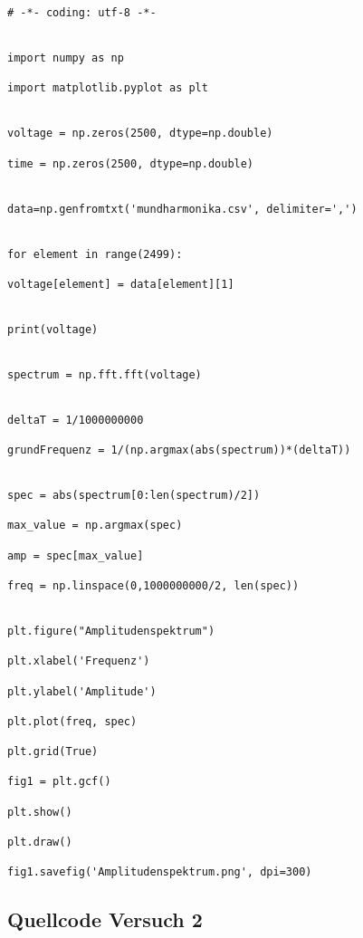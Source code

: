 \documentclass[12pt, oneside, a4paper, \docLanguage]{report}
\begin{document}
\begin{lstlisting}[style=PYTHON, frame=single, caption=Amplitudenspektrum plotten, captionpos=b, label=lst:Amplitudenspektrum_plotten]
# -*- coding: utf-8 -*-


import numpy as np

import matplotlib.pyplot as plt


voltage = np.zeros(2500, dtype=np.double)

time = np.zeros(2500, dtype=np.double)


data=np.genfromtxt('mundharmonika.csv', delimiter=',')  


for element in range(2499):

voltage[element] = data[element][1] 


print(voltage)


spectrum = np.fft.fft(voltage)


deltaT = 1/1000000000

grundFrequenz = 1/(np.argmax(abs(spectrum))*(deltaT))


spec = abs(spectrum[0:len(spectrum)/2])

max_value = np.argmax(spec)

amp = spec[max_value]

freq = np.linspace(0,1000000000/2, len(spec))


plt.figure("Amplitudenspektrum")

plt.xlabel('Frequenz')

plt.ylabel('Amplitude')

plt.plot(freq, spec)

plt.grid(True)

fig1 = plt.gcf()

plt.show()

plt.draw()

fig1.savefig('Amplitudenspektrum.png', dpi=300)
\end{lstlisting}

\newpage

\subsection{Quellcode Versuch 2}
\label{chap:APPENDIX_SOURCECODE_V2}
\end{document}
